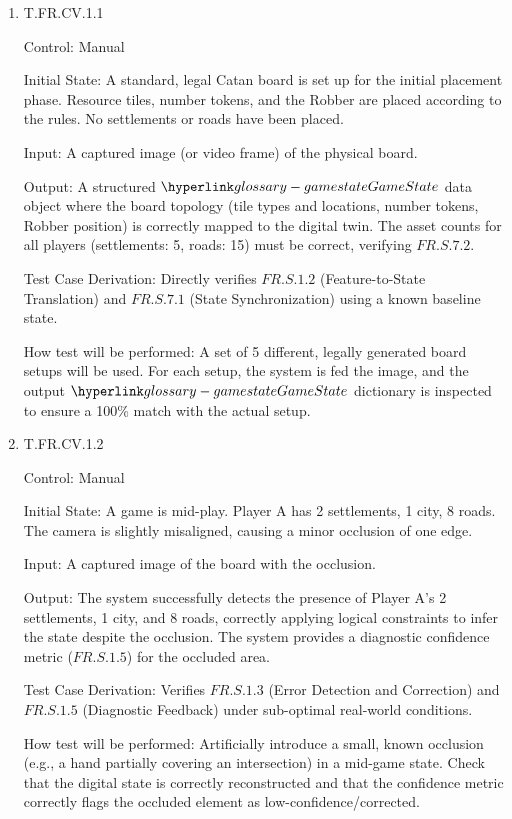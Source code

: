 \documentclass[12pt, titlepage]{article}
\begin{document}
\begin{enumerate}

\item{T.FR.CV.1.1\\}

Control: Manual

Initial State: A standard, legal Catan board is set up for the initial placement phase.
Resource tiles, number tokens, and the Robber are placed according to the rules. No settlements or roads have been placed.

Input: A captured image (or video frame) of the physical board.

Output: A structured $\GameState{}$ data object where the board topology (tile types and locations, number tokens, Robber position) is correctly mapped to the digital twin.
The asset counts for all players (settlements: 5, roads: 15) must be correct, verifying $\hyperref[FR.S.7.2]{FR.S.7.2}$.

Test Case Derivation: Directly verifies $\hyperref[FR.S.1.2]{FR.S.1.2}$ (Feature-to-State Translation) and $\hyperref[FR.S.7.1]{FR.S.7.1}$ (State Synchronization) using a known baseline state.

How test will be performed: A set of 5 different, legally generated board setups will be used.
For each setup, the system is fed the image, and the output $\GameState{}$ dictionary is inspected to ensure a 100\% match with the actual setup.

\item{T.FR.CV.1.2\\}

Control: Manual

Initial State: A game is mid-play.
Player A has 2 settlements, 1 city, 8 roads. The camera is slightly misaligned, causing a minor occlusion of one edge.

Input: A captured image of the board with the occlusion.

Output: The system successfully detects the presence of Player A's 2 settlements, 1 city, and 8 roads, correctly applying logical constraints to infer the state despite the occlusion.
The system provides a diagnostic confidence metric ($\hyperref[FR.S.1.5]{FR.S.1.5}$) for the occluded area.

Test Case Derivation: Verifies $\hyperref[FR.S.1.3]{FR.S.1.3}$ (Error Detection and Correction) and $\hyperref[FR.S.1.5]{FR.S.1.5}$ (Diagnostic Feedback) under sub-optimal real-world conditions.

How test will be performed: Artificially introduce a small, known occlusion (e.g., a hand partially covering an intersection) in a mid-game state.
Check that the digital state is correctly reconstructed and that the confidence metric correctly flags the occluded element as low-confidence/corrected.

\end{enumerate}
\end{document}

